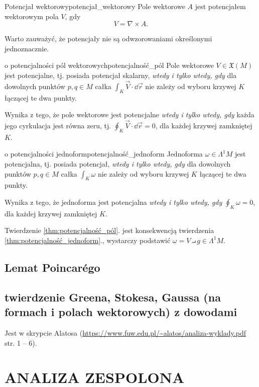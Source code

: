 \documentclass{article}
\begin{document}
\begin{dfn}{Potencjał wektorowy}{potencjał_wektorowy}
  Pole wektorowe $A$ jest potencjałem wektorowym pola $V$, gdy
  \[
  V=\nabla\!\times\!A.
  \]
\end{dfn}
Warto zauważyć, że potencjały nie są odwzorowaniami określonymi jednoznacznie.

\begin{tw}{o potencjalności pól wektorowych}{potencjalność_pól}
  Pole wektorowe $V\in\mathfrak{X}(M)$ jest potencjalne, tj. posiada potencjał skalarny, \textit{wtedy i tylko wtedy, gdy} dla dowolnych punktów $p,q\in M$ całka $\int_K \vec{V}\cdot\dd{\vec{r}}$ nie zależy od wyboru krzywej $K$ łączącej te dwa punkty.\vspace{5pt}

  Wynika z tego, że pole wektorowe jest potencjalne \textit{wtedy i tylko wtedy, gdy} każda jego cyrkulacja jest równa zeru, tj. $\oint_K \vec{V}\cdot\dd{\vec{r}}=0$, dla każdej krzywej zamkniętej $K$.

\end{tw}

\begin{tw}{o potencjalności jednoform}{potencjalność_jednoform}
  Jednoforma $\omega\in\Lambda^1M$ jest potencjalna, tj. posiada potencjał, \textit{wtedy i tylko wtedy, gdy} dla dowolnych punktów $p,q\in M$ całka $\int_K \omega$ nie zależy od wyboru krzywej $K$ łączącej te dwa punkty.\vspace{5pt}

  Wynika z tego, że jednoforma jest potencjalna \textit{wtedy i tylko wtedy, gdy} $\oint_K \omega=0$, dla każdej krzywej zamkniętej $K$.
\end{tw}

Twierdzenie \ref{thm:potencjalność_pól}. jest konsekwencją twierdzenia \ref{thm:potencjalność_jednoform}., wystarczy podstawić $\omega=V\intprod g\in \Lambda^1M$.





\subsection{Lemat Poincarégo}




\subsection{twierdzenie Greena, Stokesa, Gaussa (na formach i polach wektorowych) z dowodami}

Jest w skrypcie Alatosa (\url{https://www.fuw.edu.pl/~alatos/analiza-wyklady.pdf} str. 1 -- 6).






\section*{\centering ANALIZA ZESPOLONA}
\end{document}
